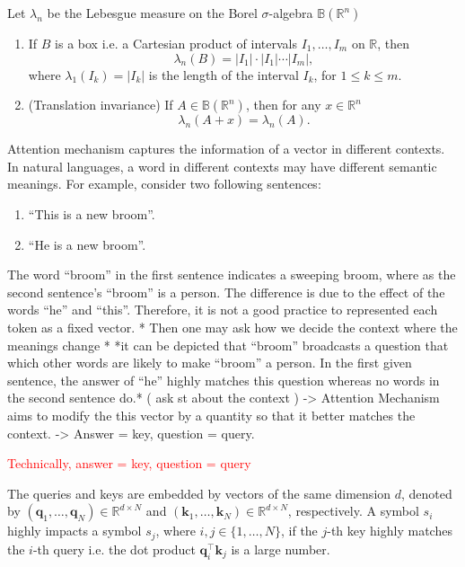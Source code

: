 \begin{theorem}
  Let $\lambda_n$ be the Lebesgue measure on the Borel $\sigma$-algebra $\mathbb{B}(\mathbb{R}^n)$
  \begin{enumerate}
    \item If $B$ is a box i.e. a Cartesian product of intervals $I_1,\ldots,I_m$ on $\mathbb{R}$, then
          $$\lambda_n(B)=|I_1|\cdot|I_1|\cdots|I_m|,$$
          where $\lambda_1(I_k)=|I_k|$ is the length of the interval $I_k$, for $1\le k\le m$.
    \item (Translation invariance) If $A\in \mathbb{B}(\mathbb{R}^n)$, then for any $x\in\mathbb{R}^n$
          $$\lambda_n(A+x)=\lambda_n(A).$$
  \end{enumerate}
\end{theorem}

Attention mechanism captures the information of a vector in different contexts. In natural languages, a word in different contexts may have different semantic meanings. For example, consider two following sentences:
\begin{enumerate}
  \item ``This is a new broom''.
  \item ``He is a new broom''.
\end{enumerate}
The word ``broom'' in the first sentence indicates a sweeping broom, where as the second sentence's ``broom'' is a person. The difference is due to the effect of the words ``he'' and ``this''. Therefore, it is not a good practice to represented each token as a fixed vector. * Then one may ask how we decide the context where the meanings change * *it can be depicted that ``broom'' broadcasts a question that which other words are likely to make ``broom'' a person. In the first given sentence, the answer of ``he'' highly matches this question whereas no words in the second sentence do.* ( ask st about the context ) -> Attention Mechanism aims to modify the this vector by a quantity so that it better matches the context. -> Answer = key, question = query.


\textcolor{red}{Technically, answer = key, question = query}

The queries and keys are embedded by vectors of the same dimension $d$, denoted by $(\mathbf{q}_1,\ldots, \mathbf{q}_N)\in\mathbb{R}^{d\times N}$ and $(\mathbf{k}_1,\ldots, \mathbf{k}_N)\in\mathbb{R}^{d\times N}$, respectively. A symbol $s_i$ highly impacts a symbol $s_j$, where $i,j\in\{1,\ldots, N\}$, if the $j$-th key highly matches the $i$-th query i.e. the dot product $\mathbf{q}_i^\top\mathbf{k}_j$ is a large number.


